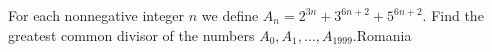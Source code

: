 For each nonnegative integer $n$ we define $A_n = 2^{3n}+3^{6n+2}+5^{6n+2}$. Find the greatest common divisor of the numbers $A_0,A_1,\ldots, A_{1999}$.Romania